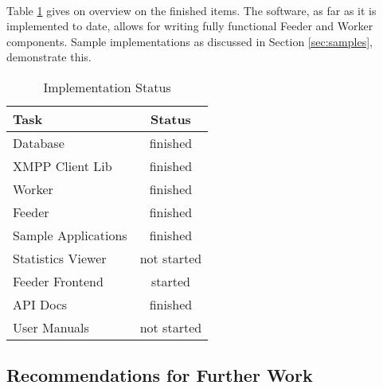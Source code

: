 \paragraph{}
Table \ref{tab:impstatus} gives on overview on the finished items. The software, as far as it is implemented to date, allows for writing fully functional Feeder and Worker components. Sample implementations as discussed in Section \ref{sec:samples}, demonstrate this.

\begin{table}[H]
\begin{tabularx}{\linewidth}{lc}
\toprule
\textbf{Task} & \textbf{Status} \\
\midrule
\endhead
Database            & finished \\
XMPP Client Lib     & finished \\
Worker              & finished \\
Feeder              & finished \\
Sample Applications & finished \\
Statistics Viewer   & not started  \\
Feeder Frontend     & started  \\
API Docs            & finished \\
User Manuals        & not started  \\
\bottomrule
\end{tabularx}
\caption{Implementation Status}
\label{tab:impstatus}
\end{table}



\subsection{Recommendations for Further Work}
